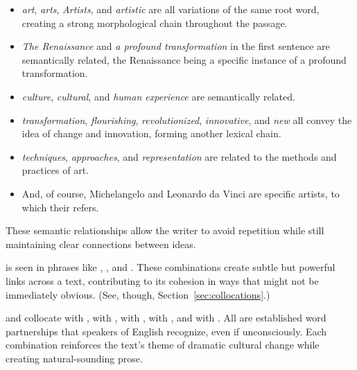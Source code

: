 \begin{itemize}[noitemsep]
    \item \emph{art}, \emph{arts}, \emph{Artists}, and \emph{artistic} are all variations of the same root word, creating a strong morphological chain throughout the passage.
    
    \item \textit{\textcolor{xGreen}{The Renaissance}} and \textit{\textcolor{xGreen}{a profound transformation}} in the first sentence are semantically related, the Renaissance being a specific instance of a profound transformation.
    
    \item \textit{\textcolor{xPurple}{culture}}, \textit{\textcolor{xPurple}{cultural}}, and \textit{\textcolor{xPurple}{human experience}} are semantically related.
    
    \item \textit{\emph{transformation}}, \textit{\emph{flourishing}}, \textit{\emph{revolutionized}}, \textit{\emph{innovative}}, and \textit{\emph{new}} all convey the idea of change and innovation, forming another lexical chain.
    
    \item \textit{\textcolor{xPink}{techniques}}, \textit{\textcolor{xPink}{approaches}}, and \textit{\textcolor{xPink}{representation}} are related to the methods and practices of art.

    \item And, of course, \textcolor{xOrange}{Michelangelo} and  \textcolor{xOrange}{Leonardo da Vinci} are specific \textcolor{xOrange}{artists}, to which \textcolor{xOrange}{their} refers.
\end{itemize}
These semantic relationships allow the writer to avoid repetition while still maintaining clear connections between ideas.

 is seen in phrases like , , and . These combinations create subtle but powerful links across a text, contributing to its cohesion in ways that might not be immediately obvious. (See, though, Section~\ref{sec:collocations}.)

 and  collocate with ,  with ,  with ,  with , and  with . All are established word partnerships that speakers of English recognize, even if unconsciously. Each combination reinforces the text's theme of dramatic cultural change while creating natural-sounding prose.

